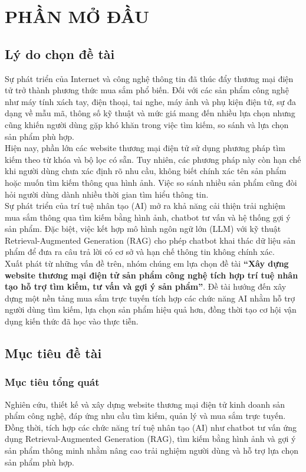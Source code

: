 \documentclass{report}
\begin{document}
\newpage
\tableofcontents
\newpage
\chapter*{PHẦN MỞ ĐẦU}

\section{Lý do chọn đề tài}
Sự phát triển của Internet và công nghệ thông tin đã thúc đẩy thương mại điện tử trở thành phương thức mua sắm phổ biến. 
Đối với các sản phẩm công nghệ như máy tính xách tay, điện thoại, tai nghe, máy ảnh và phụ kiện điện tử, sự đa dạng về mẫu 
mã, thông số kỹ thuật và mức giá mang đến nhiều lựa chọn nhưng cũng khiến người dùng gặp khó khăn trong việc tìm kiếm, 
so sánh và lựa chọn sản phẩm phù hợp.\\

Hiện nay, phần lớn các website thương mại điện tử sử dụng phương pháp tìm kiếm theo từ khóa và bộ lọc có sẵn. Tuy nhiên, 
các phương pháp này còn hạn chế khi người dùng chưa xác định rõ nhu cầu, không biết chính xác tên sản phẩm hoặc muốn tìm 
kiếm thông qua hình ảnh. Việc so sánh nhiều sản phẩm cũng đòi hỏi người dùng dành nhiều thời gian tìm hiểu thông tin.\\

Sự phát triển của trí tuệ nhân tạo (AI) mở ra khả năng cải thiện trải nghiệm mua sắm thông qua tìm kiếm bằng hình ảnh, 
chatbot tư vấn và hệ thống gợi ý sản phẩm. Đặc biệt, việc kết hợp mô hình ngôn ngữ lớn (LLM) với kỹ thuật 
Retrieval-Augmented Generation (RAG) cho phép chatbot khai thác dữ liệu sản phẩm để đưa ra câu trả lời có cơ sở và hạn chế
 thông tin không chính xác.\\
Xuất phát từ những vấn đề trên, nhóm chúng em lựa chọn đề tài \textbf{``Xây dựng website thương mại điện tử sản phẩm công
 nghệ tích hợp trí tuệ nhân tạo hỗ trợ tìm kiếm, tư vấn và gợi ý sản phẩm''}. Đề tài hướng đến xây dựng một nền tảng mua
  sắm trực tuyến tích hợp các chức năng AI nhằm hỗ trợ người dùng tìm kiếm, lựa chọn sản phẩm hiệu quả hơn, đồng thời tạo
   cơ hội vận dụng kiến thức đã học vào thực tiễn.

\section{Mục tiêu đề tài}
\subsection{Mục tiêu tổng quát}
Nghiên cứu, thiết kế và xây dựng website thương mại điện tử kinh doanh sản phẩm công nghệ, đáp ứng nhu cầu tìm kiếm, quản 
lý và mua sắm trực tuyến. Đồng thời, tích hợp các chức năng trí tuệ nhân tạo (AI) như chatbot tư vấn ứng dụng 
Retrieval-Augmented Generation (RAG), tìm kiếm bằng hình ảnh và gợi ý sản phẩm thông minh nhằm nâng cao trải nghiệm người 
dùng và hỗ trợ lựa chọn sản phẩm phù hợp.
\end{document}
